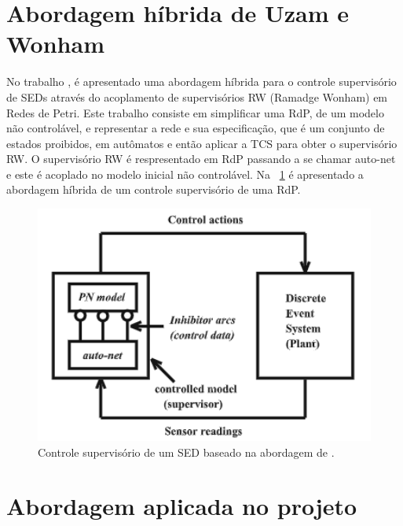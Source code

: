 \section{Abordagem h\'ibrida de Uzam e Wonham}

No trabalho \cite{UzamWonham2005}, \'e apresentado uma abordagem h\'ibrida para o controle supervis\'orio de SEDs atrav\'es do acoplamento de supervis\'orios RW (Ramadge Wonham) em Redes de Petri. Este trabalho consiste em simplificar uma RdP, de um modelo n\~ao control\'avel, e representar a rede e sua especifica\c{c}\~ao, que \'e um conjunto de estados proibidos, em aut\^omatos e ent\~ao aplicar a TCS para obter o supervis\'orio RW. O supervis\'orio RW \'e respresentado em RdP passando a se chamar auto-net e este \'e acoplado no modelo inicial n\~ao control\'avel. Na ~\ref{fig:uzamcontrol} \'e apresentado a abordagem h\'ibrida de um controle supervis\'orio de uma RdP.

\begin{figure}[!htb]
	\caption[Controle supervis\'orio de um SED baseado na abordagem de \cite{UzamWonham2005}.]{Controle supervis\'orio de um SED baseado na abordagem de \cite{UzamWonham2005}.}
	\label{fig:uzamcontrol}
	\includegraphics[width=16cm]{./figuras/UZAMCONTROL.png}\centering
\end{figure}



\section{Abordagem aplicada no projeto}

